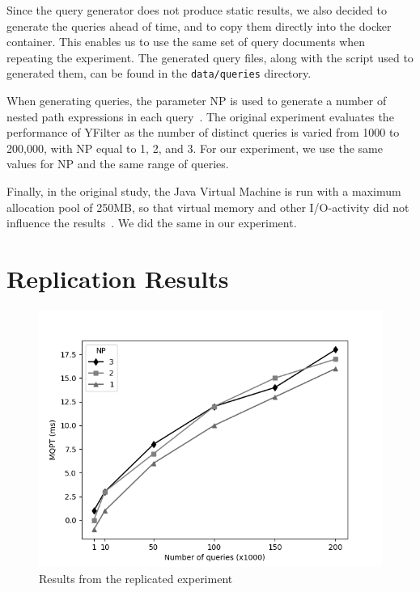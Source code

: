 \documentclass[sigconf, nonacm]{acmart}
\begin{document}
Since the query generator does not produce static results, we also decided to generate the queries ahead of time, and to copy them directly into the docker container. This enables us to use the same set of query documents when repeating the experiment. The generated query files, along with the script used to generated them, can be found in the \texttt{data/queries} directory.

When generating queries, the parameter NP is used to generate a number of nested path expressions in each query~\cite{yfilter}. The original experiment evaluates the performance of YFilter as the number of distinct queries is varied from 1000 to 200,000, with NP equal to 1, 2, and 3. For our experiment, we use the same values for NP and the same range of queries.

Finally, in the original study, the Java Virtual Machine is run with a maximum allocation pool of 250MB, so that virtual memory and other I/O-activity did not influence the results~\cite{yfilter}. We did the same in our experiment.

\section{Replication Results}

\begin{figure}
  \centering
  \includegraphics[width=\linewidth]{results/replication_figure.png}
  \caption{Results from the replicated experiment}
  \label{fig:replication_figure}
\end{figure}
\end{document}
